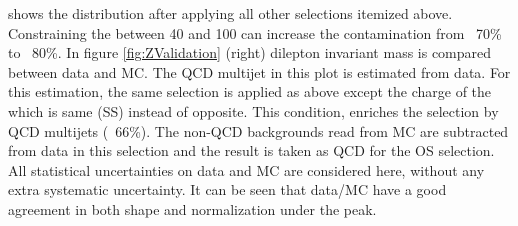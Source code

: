 shows the \tauMT distribution after applying all other selections itemized above. Constraining the \tauMT between 40 and 100 \GeV can increase the \Z contamination from ~70\% to ~80\%. In figure \ref{fig:ZValidation} (right)
dilepton invariant mass is compared between data and MC. The QCD multijet in this plot is estimated from data. For this estimation, the same 
selection is applied as above except the charge of the \muTau which is same (SS) instead of opposite. This condition, enriches the selection 
by QCD multijets (~66\%). The non-QCD backgrounds read from MC are subtracted from data in this selection and the result is 
taken as QCD for the OS selection. All statistical uncertainties on data and MC are considered here, without any extra systematic uncertainty.
It can be seen that data/MC have a good agreement in both shape and normalization under the \Z peak. 


